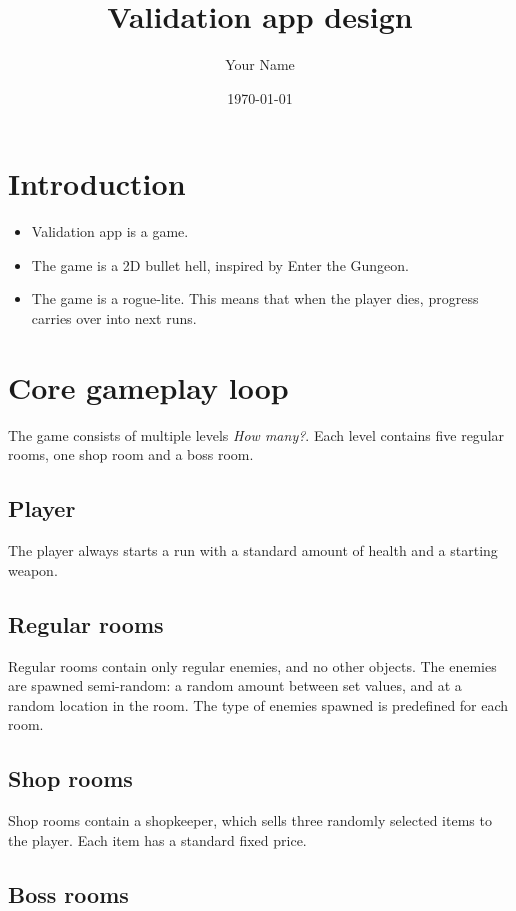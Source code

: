 \documentclass{article}
\title{Validation app design}
\author{Your Name}
\date{\today} %
\begin{document}
\maketitle %

\section{Introduction}
\begin{itemize}
    \item Validation app is a game.
    \item The game is a 2D bullet hell, inspired by Enter the Gungeon.
    \item The game is a rogue-lite. This means that when the player dies, progress carries over into next runs.
\end{itemize}

\section{Core gameplay loop}
The game consists of multiple levels \textit{How many?}.
Each level contains five regular rooms, one shop room and a boss room.

\subsection{Player}
The player always starts a run with a standard amount of health and a starting weapon.

\subsection{Regular rooms}
Regular rooms contain only regular enemies, and no other objects.
The enemies are spawned semi-random: a random amount between set values, and at a random location in the room.
The type of enemies spawned is predefined for each room.

\subsection{Shop rooms}
Shop rooms contain a shopkeeper, which sells three randomly selected items to the player.
Each item has a standard fixed price.

\subsection{Boss rooms}
\end{document}
